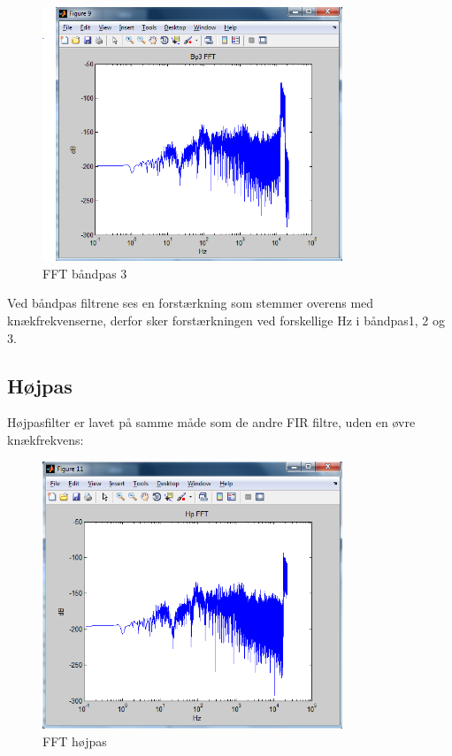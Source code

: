 \begin{figure}[h]
	\centering
	\includegraphics[width=0.8\textwidth]{Figurer/6_Bp3_FFT}
	\caption{FFT båndpas 3}
	\label{Figur 9}
\end{figure}

Ved båndpas filtrene ses en forstærkning som stemmer overens med knækfrekvenserne, derfor sker forstærkningen ved forskellige Hz i båndpas1, 2 og 3.

\subsection{Højpas}
Højpasfilter er lavet på samme måde som de andre FIR filtre, uden en øvre knækfrekvens:
\begin{figure}[h]
	\centering
	\includegraphics[width=0.8\textwidth]{Figurer/7_HP_FFT}
	\caption{FFT højpas}
	\label{Figur 10}
\end{figure}

